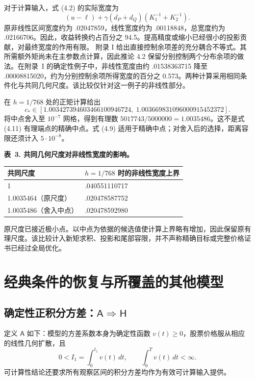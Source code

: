 对于计算输入，式 (4.2) 的实际宽度为
\[
(u-\ell)+\gamma(d_P+d_Q)(K_1^{-1}+K_2^{-1}).
\tag{4.10}
\]
原非线性区间宽度约为 .02047859，线性宽度约为 .00118848，总宽度约为 .02166706。因此，收益转换约占百分之 94.5。提高精度或缩小已经很小的投影贡献，对最终宽度的作用有限。
附录 I 给出直接控制余项差的充分耦合不等式。其所需额外矩尚未在主参数点计算，因此推论 4.2 保留分别控制两个分布余项的做法。在附录~I 的确定性例子中，非线性宽度由约 .01538363715 降至 .00008815020，约为分别控制余项所得宽度的百分之 0.573。两种计算采用相同条件化与共同几何尺度。该比较仅针对这一例子的非线性部分。

在 \(h=1/768\) 处的正矩计算给出
\[
c_*\in[1.003427394603466100946724,\;1.003669831096000915452372].
\tag{4.11}
\]
将中点舍入至 \(10^{-7}\) 网格，得到有理数
\(5017743/5000000=1.0035486\)。这不是式 (4.11) 有理端点的精确中点。式 (4.9) 适用于精确中点；对舍入后的选择，距离容限还须计入 \(5\cdot10^{-8}\)。

\noindent\textbf{表~3. 共同几何尺度对非线性宽度的影响。}
\begin{center}
\begin{tabularx}{\textwidth}{@{}l X@{}}
\toprule
共同尺度 & \(h=1/768\) 时的非线性宽度上界 \\
\midrule
1 & .040551110717 \\
1.0035464（原尺度） & .020478587752 \\
1.0035486（舍入中点） & .020478592980 \\
\bottomrule
\end{tabularx}
\end{center}

原尺度已接近极小点。以中点为依据的候选值使计算上界略有增加，因此保留原有理尺度。该比较计入新矩求积、投影和尾部容限，并不声称精确目标或完整价格证书已经过全局优化。


\section{经典条件的恢复与所覆盖的其他模型}

\subsection{确定性正积分方差：\(\mathsf A\Rightarrow\mathsf H\)}

定义 \(\mathsf A\) 如下：模型的方差系数本身为确定性函数 \(v(t)\ge0\)，股票价格服从相应的线性几何扩散，且
\[
0<I_1=\int_0^{t_1}v(t)\,dt,\qquad \int_0^T v(t)\,dt<\infty.
\tag{5.1}
\]
可计算性结论还要求所有观察区间的积分方差均作为有效可计算输入提供。

